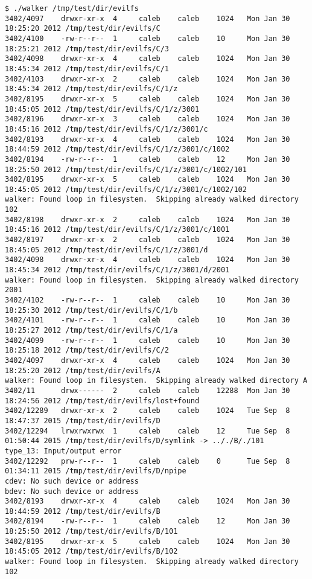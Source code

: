 \documentclass{article}
\begin{document}
\begin{lstlisting}
$ ./walker /tmp/test/dir/evilfs
3402/4097    drwxr-xr-x  4     caleb    caleb    1024   Mon Jan 30 18:25:20 2012 /tmp/test/dir/evilfs/C 
3402/4100    -rw-r--r--  1     caleb    caleb    10     Mon Jan 30 18:25:21 2012 /tmp/test/dir/evilfs/C/3 
3402/4098    drwxr-xr-x  4     caleb    caleb    1024   Mon Jan 30 18:45:34 2012 /tmp/test/dir/evilfs/C/1 
3402/4103    drwxr-xr-x  2     caleb    caleb    1024   Mon Jan 30 18:45:34 2012 /tmp/test/dir/evilfs/C/1/z 
3402/8195    drwxr-xr-x  5     caleb    caleb    1024   Mon Jan 30 18:45:05 2012 /tmp/test/dir/evilfs/C/1/z/3001 
3402/8196    drwxr-xr-x  3     caleb    caleb    1024   Mon Jan 30 18:45:16 2012 /tmp/test/dir/evilfs/C/1/z/3001/c 
3402/8193    drwxr-xr-x  4     caleb    caleb    1024   Mon Jan 30 18:44:59 2012 /tmp/test/dir/evilfs/C/1/z/3001/c/1002 
3402/8194    -rw-r--r--  1     caleb    caleb    12     Mon Jan 30 18:25:50 2012 /tmp/test/dir/evilfs/C/1/z/3001/c/1002/101 
3402/8195    drwxr-xr-x  5     caleb    caleb    1024   Mon Jan 30 18:45:05 2012 /tmp/test/dir/evilfs/C/1/z/3001/c/1002/102 
walker: Found loop in filesystem.  Skipping already walked directory 102
3402/8198    drwxr-xr-x  2     caleb    caleb    1024   Mon Jan 30 18:45:16 2012 /tmp/test/dir/evilfs/C/1/z/3001/c/1001 
3402/8197    drwxr-xr-x  2     caleb    caleb    1024   Mon Jan 30 18:45:05 2012 /tmp/test/dir/evilfs/C/1/z/3001/d 
3402/4098    drwxr-xr-x  4     caleb    caleb    1024   Mon Jan 30 18:45:34 2012 /tmp/test/dir/evilfs/C/1/z/3001/d/2001 
walker: Found loop in filesystem.  Skipping already walked directory 2001
3402/4102    -rw-r--r--  1     caleb    caleb    10     Mon Jan 30 18:25:30 2012 /tmp/test/dir/evilfs/C/1/b 
3402/4101    -rw-r--r--  1     caleb    caleb    10     Mon Jan 30 18:25:27 2012 /tmp/test/dir/evilfs/C/1/a 
3402/4099    -rw-r--r--  1     caleb    caleb    10     Mon Jan 30 18:25:18 2012 /tmp/test/dir/evilfs/C/2 
3402/4097    drwxr-xr-x  4     caleb    caleb    1024   Mon Jan 30 18:25:20 2012 /tmp/test/dir/evilfs/A 
walker: Found loop in filesystem.  Skipping already walked directory A
3402/11      drwx------  2     caleb    caleb    12288  Mon Jan 30 18:24:56 2012 /tmp/test/dir/evilfs/lost+found 
3402/12289   drwxr-xr-x  2     caleb    caleb    1024   Tue Sep  8 18:47:37 2015 /tmp/test/dir/evilfs/D 
3402/12294   lrwxrwxrwx  1     caleb    caleb    12     Tue Sep  8 01:50:44 2015 /tmp/test/dir/evilfs/D/symlink -> .././B/./101
type_13: Input/output error
3402/12292   prw-r--r--  1     caleb    caleb    0      Tue Sep  8 01:34:11 2015 /tmp/test/dir/evilfs/D/npipe 
cdev: No such device or address
bdev: No such device or address
3402/8193    drwxr-xr-x  4     caleb    caleb    1024   Mon Jan 30 18:44:59 2012 /tmp/test/dir/evilfs/B 
3402/8194    -rw-r--r--  1     caleb    caleb    12     Mon Jan 30 18:25:50 2012 /tmp/test/dir/evilfs/B/101 
3402/8195    drwxr-xr-x  5     caleb    caleb    1024   Mon Jan 30 18:45:05 2012 /tmp/test/dir/evilfs/B/102 
walker: Found loop in filesystem.  Skipping already walked directory 102
\end{lstlisting}
\end{document}
